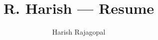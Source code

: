 \documentclass[10pt, a4paper]{article}
\title{R. Harish --- Resume}
\author{Harish Rajagopal}
\begin{document}
    
    
    \begin{multicols}{2}
        
        
        
        
    \end{multicols}
    
\end{document}

